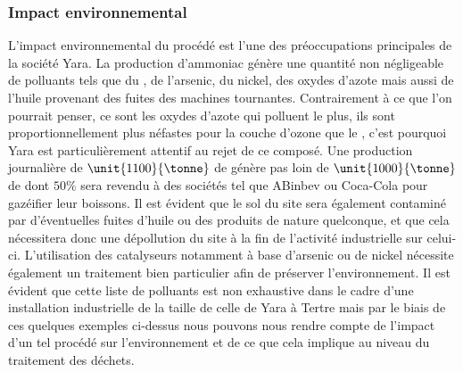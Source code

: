 \subsubsection*{Impact environnemental}
L'impact environnemental du procédé est l'une des préoccupations principales de la société Yara. La production d'ammoniac génère une quantité non négligeable de polluants tels que du , de l'arsenic, du nickel, des oxydes d'azote mais aussi de l'huile provenant des fuites des machines tournantes. Contrairement à ce que l'on pourrait penser, ce sont les oxydes d'azote
qui polluent le plus, ils sont proportionnellement plus néfastes pour la couche d'ozone que le , c'est pourquoi Yara est particulièrement attentif au rejet de ce composé. Une production journalière de $\unit{1100}{\tonne}$ de  génère pas loin de $\unit {1000}{\tonne}$ de  dont $50 \%$ sera revendu à des sociétés tel que ABinbev ou Coca-Cola pour gazéifier leur boissons. Il est évident que le sol du site sera également contaminé par d'éventuelles fuites d'huile ou des produits de nature quelconque, et que cela nécessitera donc une dépollution du site à la fin de l'activité industrielle sur celui-ci. L'utilisation des catalyseurs notamment à base d'arsenic ou de nickel nécessite également un traitement bien particulier afin de préserver l'environnement. Il est évident que cette liste de polluants est non exhaustive dans le cadre d'une installation industrielle de la taille de celle de Yara à Tertre mais par le biais de ces quelques exemples ci-dessus nous pouvons nous rendre compte de l'impact d'un tel procédé sur l'environnement et de ce que cela implique au niveau du traitement des déchets.
